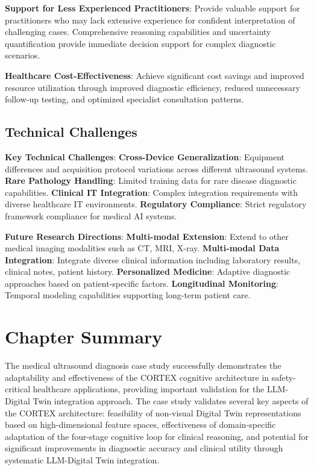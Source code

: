 \textbf{Support for Less Experienced Practitioners}: Provide valuable support for practitioners who may lack extensive experience for confident interpretation of challenging cases. Comprehensive reasoning capabilities and uncertainty quantification provide immediate decision support for complex diagnostic scenarios.

\textbf{Healthcare Cost-Effectiveness}: Achieve significant cost savings and improved resource utilization through improved diagnostic efficiency, reduced unnecessary follow-up testing, and optimized specialist consultation patterns.

\subsection{Technical Challenges}

\textbf{Key Technical Challenges}:
\textbf{Cross-Device Generalization}: Equipment differences and acquisition protocol variations across different ultrasound systems.
\textbf{Rare Pathology Handling}: Limited training data for rare disease diagnostic capabilities.
\textbf{Clinical IT Integration}: Complex integration requirements with diverse healthcare IT environments.
\textbf{Regulatory Compliance}: Strict regulatory framework compliance for medical AI systems.

\textbf{Future Research Directions}:
\textbf{Multi-modal Extension}: Extend to other medical imaging modalities such as CT, MRI, X-ray.
\textbf{Multi-modal Data Integration}: Integrate diverse clinical information including laboratory results, clinical notes, patient history.
\textbf{Personalized Medicine}: Adaptive diagnostic approaches based on patient-specific factors.
\textbf{Longitudinal Monitoring}: Temporal modeling capabilities supporting long-term patient care.

\section{Chapter Summary}

The medical ultrasound diagnosis case study successfully demonstrates the adaptability and effectiveness of the CORTEX cognitive architecture in safety-critical healthcare applications, providing important validation for the LLM-Digital Twin integration approach. The case study validates several key aspects of the CORTEX architecture: feasibility of non-visual Digital Twin representations based on high-dimensional feature spaces, effectiveness of domain-specific adaptation of the four-stage cognitive loop for clinical reasoning, and potential for significant improvements in diagnostic accuracy and clinical utility through systematic LLM-Digital Twin integration.

